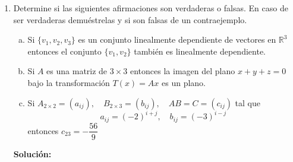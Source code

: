 \documentclass[12pt]{article}
\newenvironment{solucion}
{\begin{mdframed}[backgroundcolor=black!10]
		{\bf Solución:}\\
	}
	{
	\end{mdframed}
}
\newenvironment{preguntas}
{\begin{enumerate}\itemsep12pt
	}
	{
	\end{enumerate}
}
\newcommand{\R}{\mathbb{R}}
\begin{document}
\begin{preguntas}
\begin{solucion}
$$\begin{bmatrix}
\end{bmatrix}
$$
Finalmente, podemos escribir $T^{-1}(x)$ como
$$T^{-1}(x) = (x_1, -x_1 + x_2, -x_2+x_3)$$
\end{solucion}
\item Determine si las siguientes afirmaciones son verdaderas o falsas. En caso de ser verdaderas demuéstrelas y si son falsas de un contraejemplo.
\begin{enumerate}[a)]
\item Si $\{v_1, v_2, v_3\}$ es un conjunto linealmente dependiente de vectores en $\R^3$ entonces el conjunto $\{v_1, v_2\}$ también es linealmente dependiente.
\item Si $A$ es una matriz de $3 \times 3$ entonces la imagen del plano $x+y+z=0$ bajo la transformación $T(x)=Ax$ es un plano.
\item Si $A_{2\times 2} = (a_{ij}), \quad B_{2\times 3} = (b_{ij}), \quad AB = C = (c_{ij})$ tal que
$$a_{ij} = (-2)^{i+j}, \quad b_{ij} = (-3)^{i-j}$$
entonces $c_{23} = -\dfrac{56}{9}$
\end{enumerate}
\begin{solucion}


\end{solucion}
\end{preguntas}
\end{document}
